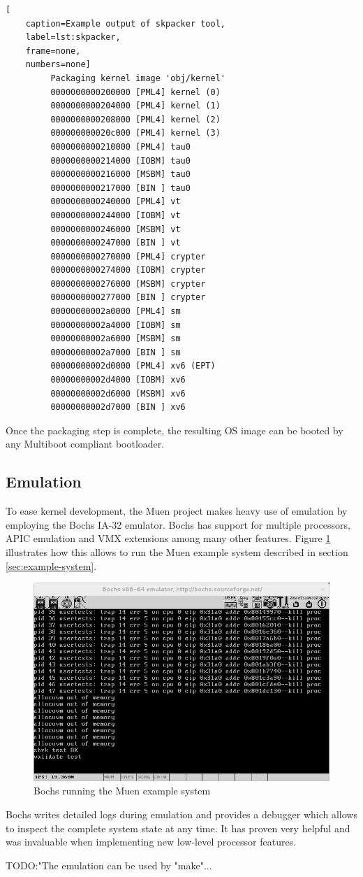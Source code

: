\begin{lstlisting}[
	caption=Example output of skpacker tool,
	label=lst:skpacker,
	frame=none,
	numbers=none]
         Packaging kernel image 'obj/kernel'
         0000000000200000 [PML4] kernel (0)
         0000000000204000 [PML4] kernel (1)
         0000000000208000 [PML4] kernel (2)
         000000000020c000 [PML4] kernel (3)
         0000000000210000 [PML4] tau0
         0000000000214000 [IOBM] tau0
         0000000000216000 [MSBM] tau0
         0000000000217000 [BIN ] tau0
         0000000000240000 [PML4] vt
         0000000000244000 [IOBM] vt
         0000000000246000 [MSBM] vt
         0000000000247000 [BIN ] vt
         0000000000270000 [PML4] crypter
         0000000000274000 [IOBM] crypter
         0000000000276000 [MSBM] crypter
         0000000000277000 [BIN ] crypter
         00000000002a0000 [PML4] sm
         00000000002a4000 [IOBM] sm
         00000000002a6000 [MSBM] sm
         00000000002a7000 [BIN ] sm
         00000000002d0000 [PML4] xv6 (EPT)
         00000000002d4000 [IOBM] xv6
         00000000002d6000 [MSBM] xv6
         00000000002d7000 [BIN ] xv6
\end{lstlisting}

Once the packaging step is complete, the resulting OS image can be booted by any
Multiboot \cite{multiboot} compliant bootloader.

\subsection{Emulation}
To ease kernel development, the Muen project makes heavy use of emulation by
employing the Bochs IA-32 emulator. Bochs has support for multiple processors,
APIC emulation and VMX extensions among many other features. Figure
\ref{fig:bochs} illustrates how this allows to run the Muen example system
described in section \ref{sec:example-system}.

\begin{figure}[h]
	\centering
	\includegraphics[width=\textwidth]{images/bochs}
	\caption{Bochs running the Muen example system}
	\label{fig:bochs}
\end{figure}

Bochs writes detailed logs during emulation and provides a debugger which allows
to inspect the complete system state at any time. It has proven very helpful
and was invaluable when implementing new low-level processor features.

TODO:"The emulation can be used by "make"...
